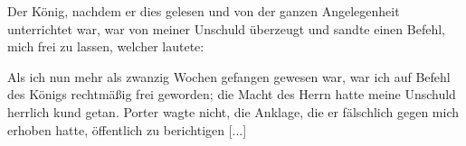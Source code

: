 Der König, nachdem er dies gelesen und von der ganzen
Angelegenheit unterrichtet war, war von meiner Unschuld überzeugt 
und sandte einen Befehl, mich frei zu lassen, welcher lautete:


Als ich nun mehr als zwanzig Wochen gefangen gewesen
war, war ich auf Befehl des Königs rechtmäßig frei geworden;
die Macht des Herrn hatte meine Unschuld herrlich kund getan.
Porter wagte nicht, die Anklage, die er fälschlich gegen mich
erhoben hatte, öffentlich zu berichtigen [...]


